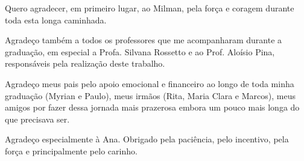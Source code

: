 Quero agradecer, em primeiro lugar, ao Milman, pela força e coragem durante toda esta longa caminhada.

Agradeço também a todos os professores que me acompanharam durante a graduação, em especial a Profa. Silvana Rossetto e ao Prof. Aloísio Pina, responsáveis pela realização deste trabalho.

Agradeço meus pais pelo apoio emocional e financeiro ao longo de toda minha graduação (Myrian e Paulo), meus irmãos (Rita, Maria Clara e Marcos), meus amigos por fazer dessa jornada mais prazerosa embora um pouco mais longa do que precisava ser.

Agradeço especialmente à Ana. Obrigado pela paciência, pelo incentivo, pela força e principalmente pelo carinho.